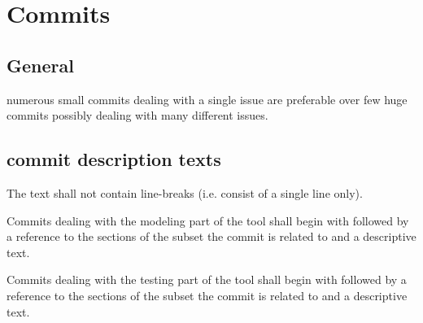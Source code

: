\documentclass[draft]{efsguide}
\begin{document}
\section{Commits}
\subsection{General}
\begin{rules}
\item \label{rule:smallcommits} numerous small commits dealing with a single issue are preferable over few huge commits possibly dealing with many different issues. 
\end{rules}

\subsection{commit description texts}
\label{rules:committexts}
\begin{rules}
\item The text shall not contain line-breaks (i.e. consist of a single line only). 
\item Commits dealing with the modeling part of the tool shall begin with  followed by a reference to the sections of the subset the commit is related to and a descriptive text. 
\item Commits dealing with the testing part of the tool shall begin with  followed by a reference to the sections of the subset the commit is related to and a descriptive text. 
\end{rules}
\end{document}
